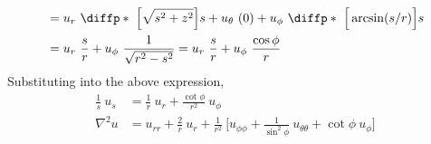 \begin{enumerate}
\begin{align}
                         & = u_r\ \diffp*{\ \Big[\sqrt{s^2 + z^2}\Big]}{s}
              + u_\theta\ (0) + u_\phi\ \diffp*{\ \Big[\arcsin(s/r)\Big]}{s}         \\
                         & = u_r\ \frac{s}{r} + u_\phi\ \frac{1}{\sqrt{r^2 - s^2}}
              = u_r\ \frac{s}{r} + u_\phi\ \frac{\cos\phi}{r}
          \end{align}
          Substituting into the above expression,
          \begin{align}
              \frac{1}{s}\ u_s & = \frac{1}{r}\ u_r + \frac{\cot\phi}{r^2}\ u_\phi \\
              \nabla^2u        & = u_{rr} + \frac{2}{r}\ u_r + \frac{1}{r^2}
              \ \Bigg[ u_{\phi\phi} + \frac{1}{\sin^2\phi}\ u_{\theta\theta}
                  + \cot\phi\ u_\phi \Bigg]
          \end{align}


\end{enumerate}
